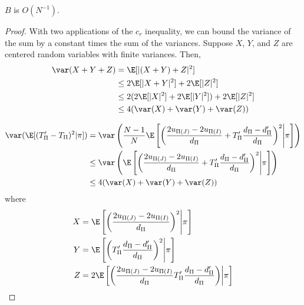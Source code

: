 \begin{proposition}
  $B$ is $O(N^{-1})$.
\end{proposition}
\begin{proof}
  With two applications of the $c_r$ inequality, we can bound the
  variance of the sum by a constant times the sum of the variances.  
  Suppose $X$, $Y$, and $Z$ are centered random variables with finite
  variances.  Then, 
  \begin{align*}
    \var(X+Y+Z) &= \E[|(X+Y)+Z|^2] \\
    &\leq 2 \E[|X+Y|^2] + 2\E[|Z|^2] \\
    &\leq 2(2\E[|X|^2] + 2\E[|Y|^2]) + 2\E[|Z|^2] \\
    &\leq 4(\var(X) + \var(Y) + \var(Z))
  \end{align*}

  \begin{align*}
    \var (\E[(T_{\Pi}'-T_{\Pi})^2 | \pi]) &= \var \left ( \frac{N-1}{N}\E \left [
      \left ( \frac{2u_{\Pi(J)}-2u_{\Pi(I)}}{d_{\Pi}}+T_{\Pi}'\frac{d_{\Pi}-d_{\Pi}'}{d_{\Pi}} \right )^2
        \middle | \pi \right ] \right ) \\
    &\leq \var \left ( \E \left [
      \left ( \frac{2u_{\Pi(J)}-2u_{\Pi(I)}}{d_{\Pi}}+T_{\Pi}'\frac{d_{\Pi}-d_{\Pi}'}{d_{\Pi}} \right )^2
        \middle | \pi \right ] \right ) \\
    &\leq 4(\var(X) + \var(Y) + \var(Z))
  \end{align*}
  where
  \begin{align*}
    X &= \E \left [ \left ( \frac{2u_{\Pi(J)}-2u_{\Pi(I)}}{d_{\Pi}} \right )^2
        \middle | \pi \right ] \\
    Y &= \E \left [ \left
          ( T_{\Pi}'\frac{d_{\Pi}-d_{\Pi}'}{d_{\Pi}} \right )^2 \middle | \pi \right ] \\
    Z &= 2 \E \left [ \left ( \frac{2u_{\Pi(J)}-2u_{\Pi(I)}}{d_{\Pi}}
         T_{\Pi}'\frac{d_{\Pi}-d_{\Pi}'}{d_{\Pi}} \right ) \middle | \pi \right ]
  \end{align*}


\end{proof}
